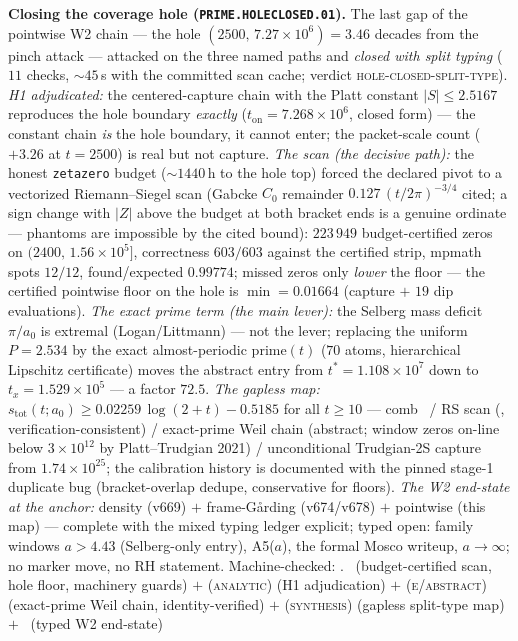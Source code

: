 \par\smallskip\noindent\textbf{Closing the coverage hole
(\texttt{PRIME.HOLECLOSED.01}).}
The last gap of the pointwise W2 chain --- the hole
$(2500,\,7.27\times10^{6})=3.46$ decades from the pinch attack ---
attacked on the three named paths and \emph{closed with split
typing} ($11$ checks, ${\sim}45$\,s with the committed scan cache;
verdict \textsc{hole-closed-split-type}).  \emph{H1 adjudicated:}
the centered-capture chain with the Platt constant $|S|\le2.5167$
reproduces the hole boundary \emph{exactly}
($t_{\mathrm{on}}=7.268\times10^{6}$, closed form) --- the constant
chain \emph{is} the hole boundary, it cannot enter; the packet-scale
count ($+3.26$ at $t=2500$) is real but not capture.  \emph{The
scan (the decisive path):} the honest \texttt{zetazero} budget
(${\sim}1440$\,h to the hole top) forced the declared pivot to a
vectorized Riemann--Siegel scan (Gabcke $C_0$ remainder
$0.127\,(t/2\pi)^{-3/4}$ cited; a sign change with $|Z|$ above the
budget at both bracket ends is a genuine ordinate --- phantoms are
impossible by the cited bound): $223\,949$ budget-certified zeros on
$(2400,\,1.56\times10^{5}]$, correctness $603/603$ against the
certified strip, mpmath spots $12/12$, found/expected $0.99774$;
missed zeros only \emph{lower} the floor --- the certified pointwise
floor on the hole is $\min=0.01664$ (capture $+$ $19$ dip
evaluations).  \emph{The exact prime term (the main lever):} the
Selberg mass deficit $\pi/a_0$ is extremal (Logan/Littmann) --- not
the lever; replacing the uniform $P=2.534$ by the exact
almost-periodic $\mathrm{prime}(t)$ ($70$ atoms, hierarchical
Lipschitz certificate) moves the abstract entry from
$t^*=1.108\times10^{7}$ down to $t_x=1.529\times10^{5}$ --- a factor
$72.5$.  \emph{The gapless map:}
$s_{\mathrm{tot}}(t;a_0)\ge0.02259\,\log(2+t)-0.5185$ for all
$t\ge10$ --- comb \mE\ / RS scan (\mE, verification-consistent) /
exact-prime Weil chain (abstract; window zeros on-line below
$3\times10^{12}$ by Platt--Trudgian 2021) / unconditional
Trudgian-2S capture from $1.74\times10^{25}$; the calibration
history is documented with the pinned stage-1 duplicate bug
(bracket-overlap dedupe, conservative for floors).  \emph{The W2
end-state at the anchor:} density (v669) $+$ frame-G\aa rding
(v674/v678) $+$ pointwise (this map) --- complete with the mixed
typing ledger explicit; typed open: family windows $a>4.43$
(Selberg-only entry), A5($a$), the formal Mosco writeup,
$a\to\infty$; no marker move, no RH statement.
Machine-checked: .
\mE\ (budget-certified scan, hole floor, machinery guards) $+$
(\textsc{analytic}) (H1 adjudication) $+$ (\textsc{e/abstract})
(exact-prime Weil chain, identity-verified) $+$
(\textsc{synthesis}) (gapless split-type map) $+$ \mC\ (typed W2
end-state)
\par\smallskip


